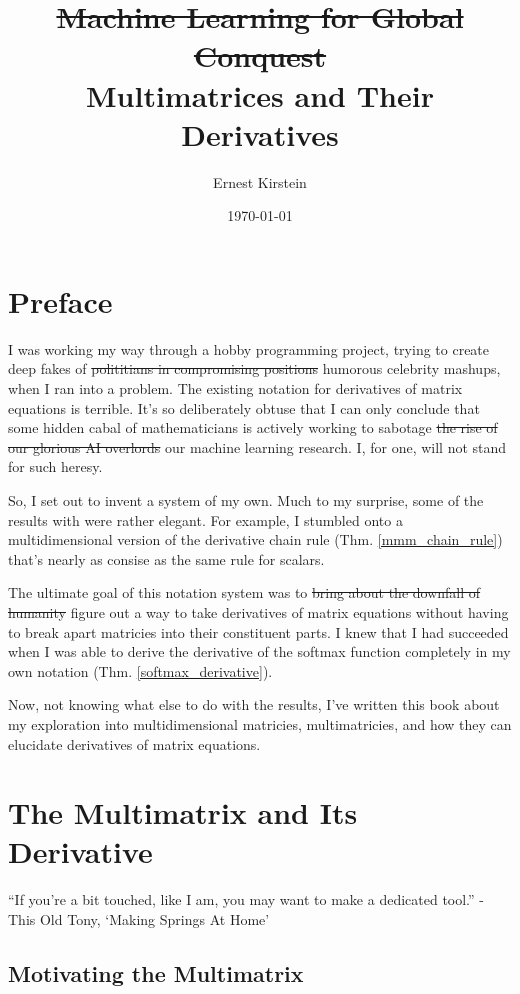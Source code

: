 \documentclass[12pt]{book}
\title{%
  \sout{Machine Learning for Global Conquest} \\
  Multimatrices and Their Derivatives}
\author{Ernest Kirstein}
\date{\today}
\theoremstyle{plain}
\theoremstyle{definition}
\theoremstyle{ppart}
\theoremstyle{case}
\theoremstyle{solution}
\begin{document}
\maketitle

\chapter*{Preface}
I was working my way through a hobby programming project, trying to create deep fakes of
\sout{polititians in compromising positions} humorous celebrity mashups, when I ran into a problem.
The existing notation for derivatives of matrix equations is terrible.
It's so deliberately obtuse that I can only conclude that some hidden cabal of
mathematicians is actively working to sabotage \sout{the rise of our glorious AI overlords}
our machine learning research.
I, for one, will not stand for such heresy.

So, I set out to invent a system of my own. Much to my surprise, some of the
results with were rather elegant. For example, I stumbled onto a
multidimensional version of the derivative chain rule (Thm. \ref{mmm_chain_rule})
that's nearly as consise as the same rule for scalars.

The ultimate goal of this notation system was to \sout{bring about the downfall
of humanity} figure out a way to take derivatives
of matrix equations without having to break apart matricies into their constituent
parts. I knew that I had succeeded when I was able to derive the derivative of the
softmax function completely in my own notation (Thm. \ref{softmax_derivative}).

Now, not knowing what else to do with the results, I've written this book
about my exploration into multidimensional matricies,
multimatricies, and how they can elucidate derivatives of matrix equations.

\tableofcontents

\chapter{The Multimatrix and Its Derivative}

\begin{displayquote}
``If you're a bit touched, like I am, you may want to make a dedicated tool.'' -
This Old Tony, `Making Springs At Home' \cite{youtube:tony}
\end{displayquote}

\section{Motivating the Multimatrix}
\end{document}
